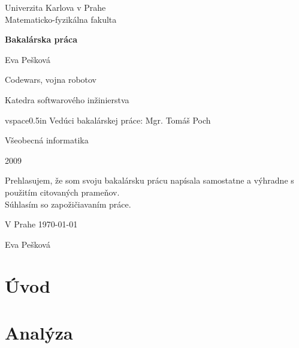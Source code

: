 \documentclass[12pt,a4paper,notitlepage]{report}
\begin{document}
\begin{titlepage}
\begin{center}
\vspace{1.5in}
{\rm Univerzita Karlova v Prahe\\
    Matematicko-fyzikálna fakulta}
\par
\vspace{0.7in}
{\huge \bf Bakalárska práca}
\par
\vspace{0.5in}
{Eva Pešková}
\par
\vspace{0.5in}
Codewars, vojna robotov
\par
\vfill
Katedra softwarového inžinierstva
\par
vspace{0.5in}
Vedúci bakalárskej práce: Mgr. Tomáš Poch
\par
\vspace{0.5in}
Všeobecná informatika
\par
\vspace{0.5in}
2009
\end{center}
\end{titlepage}
\vfill
Prehlasujem, že som svoju bakalársku prácu napísala samostatne a výhradne s použitím citovaných prameňov.\\
Súhlasím so zapožičiavaním práce.\\
\par
V Prahe \today
\begin{flushright}
Eva Pešková
\end{flushright}

\newtheorem{definicia}{Značenie}

\tableofcontents
\chapter{Úvod}%

\chapter{Analýza}
%


\end{document}
